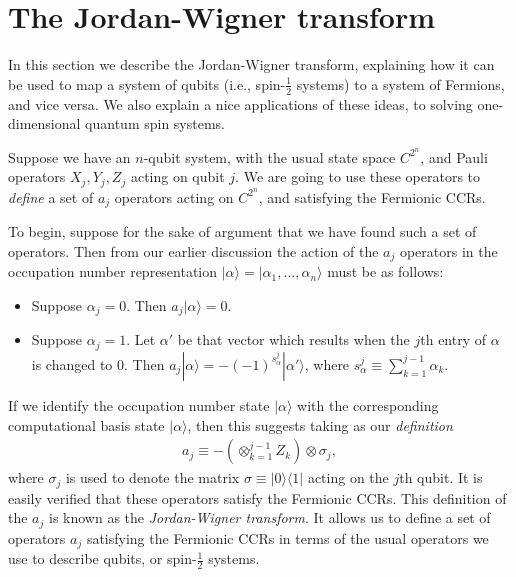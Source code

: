 \documentclass[12pt]{article}
\begin{document}
\section{The Jordan-Wigner transform}

In this section we describe the Jordan-Wigner transform, explaining how
it can be used to map a system of qubits (i.e., spin-$\frac 12$
systems) to a system of Fermions, and vice versa.  We also explain a
nice applications of these ideas, to solving one-dimensional quantum
spin systems.

Suppose we have an $n$-qubit system, with the usual state space
$C^{2^n}$, and Pauli operators $X_j, Y_j,Z_j$ acting on qubit $j$.  We
are going to use these operators to \emph{define} a set of $a_j$
operators acting on $C^{2^n}$, and satisfying the Fermionic CCRs.

To begin, suppose for the sake of argument that we have found such a
set of operators.  Then from our earlier discussion the action of the
$a_j$ operators in the occupation number representation
$|\alpha\rangle = |\alpha_1,\ldots,\alpha_n\rangle$ must be as
follows:
\begin{itemize}
\item Suppose $\alpha_j = 0$.  Then $a_j|\alpha\rangle = 0$.
  
\item Suppose $\alpha_j = 1$.  Let $\alpha'$ be that vector which
  results when the $j$th entry of $\alpha$ is changed to $0$.  Then
  $a_j|\alpha\rangle = -(-1)^{s_\alpha^j} |\alpha'\rangle$, where
  $s_\alpha^j \equiv \sum_{k=1}^{j-1} \alpha_k$.
\end{itemize}
If we identify the occupation number state $|\alpha\rangle$ with the
corresponding computational basis state $|\alpha\rangle$, then this
suggests taking as our \emph{definition}
\begin{eqnarray}
  a_j \equiv -\left( \otimes_{k=1}^{j-1} Z_k \right) \otimes \sigma_j,
\end{eqnarray}
where $\sigma_j$ is used to denote the matrix $\sigma \equiv |0\rangle
\langle 1|$ acting on the $j$th qubit.  It is easily verified that
these operators satisfy the Fermionic CCRs.  This definition of the
$a_j$ is known as the \emph{Jordan-Wigner transform}.  It allows us to
define a set of operators $a_j$ satisfying the Fermionic CCRs in terms
of the usual operators we use to describe qubits, or spin-$\frac 12$
systems.
\end{document}
